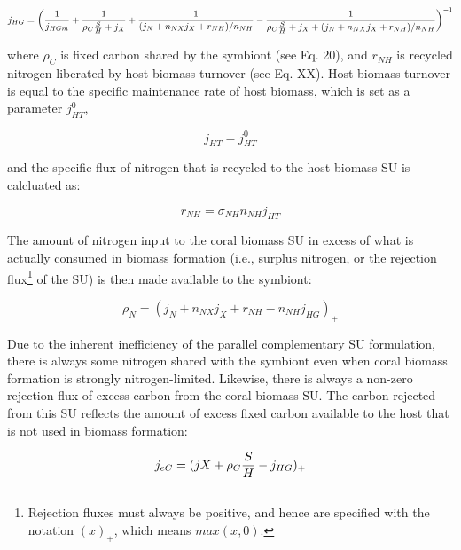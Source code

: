 \documentclass[]{elsarticle} %
\begin{document}
\begin{equation} j_{HG} = \bigg({1 \over j_{HGm}} + {1 \over {\rho_C{S \over H} + j_X}} + {1 \over {(j_N + n_{NX}j_X + r_{NH}) / n_{NH}}} - {1 \over {{\rho_C{S \over H} + j_X} + (j_N + n_{NX}j_X + r_{NH}) / n_{NH}}}\bigg)^{-1} \end{equation}

where \(\rho_C\) is fixed carbon shared by the symbiont (see Eq. 20),
and \(r_{NH}\) is recycled nitrogen liberated by host biomass turnover
(see Eq. XX). Host biomass turnover is equal to the specific maintenance
rate of host biomass, which is set as a parameter \(j_{HT}^0\),

\begin{equation} j_{HT}=j_{HT}^0 \end{equation}

and the specific flux of nitrogen that is recycled to the host biomass
SU is calcluated as:

\begin{equation} r_{NH}=\sigma_{NH}n_{NH}j_{HT} \end{equation}

The amount of nitrogen input to the coral biomass SU in excess of what
is actually consumed in biomass formation (i.e., surplus nitrogen, or
the rejection flux\footnote{Rejection fluxes must always be positive,
  and hence are specified with the notation \((x)_+\), which means
  \(max(x, 0)\).} of the SU) is then made available to the symbiont:

\begin{equation} \rho_N = (j_N + n_{NX}j_X + r_{NH} - n_{NH}j_{HG})_+ \end{equation}

Due to the inherent inefficiency of the parallel complementary SU
formulation, there is always some nitrogen shared with the symbiont even
when coral biomass formation is strongly nitrogen-limited. Likewise,
there is always a non-zero rejection flux of excess carbon from the
coral biomass SU. The carbon rejected from this SU reflects the amount
of excess fixed carbon available to the host that is not used in biomass
formation:

\begin{equation} j_{eC} = (jX + \rho_C{S \over H} - j_{HG})_+ \end{equation}
\end{document}
